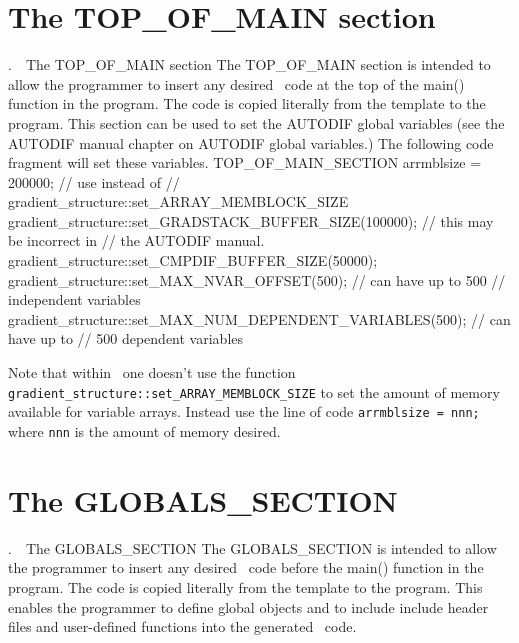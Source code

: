 \documentclass[12pt]{book}
\makeatletter
\def\mysection#1{\section{#1}{\bigbf \medbreak\noindent\number\c@chapter.\number\c@section\ \ #1\medbreak}}
\makeatother
\begin{document}
\htmlnewfile
{}
\mysection{The TOP\_OF\_MAIN section}
The TOP\_OF\_MAIN section is intended to allow the programmer to insert any desired
\cplus\ code at the top of the main() function in the program. The code is copied
literally from the template to the program.  This section can be used to set
the AUTODIF global variables (see the AUTODIF manual chapter on
AUTODIF global variables.)  The following code fragment will set these
variables.
\beginexample
TOP_OF_MAIN_SECTION
  arrmblsize = 200000; // use instead of 
                   // gradient_structure::set_ARRAY_MEMBLOCK_SIZE
  gradient_structure::set_GRADSTACK_BUFFER_SIZE(100000); // this may be incorrect in 
                                       // the AUTODIF manual.
  gradient_structure::set_CMPDIF_BUFFER_SIZE(50000); 
  gradient_structure::set_MAX_NVAR_OFFSET(500); // can have up to 500 
                                             // independent variables
  gradient_structure::set_MAX_NUM_DEPENDENT_VARIABLES(500); // can have up to 
                                          // 500 dependent variables
\endexample
{}

Note that within \ADM\ one doesn't use the function
{\tt gradient\_structure::set\_ARRAY\_MEMBLOCK\_SIZE} to set the amount of memory available
for variable arrays. Instead use the line of code {\tt arrmblsize = nnn;}
where {\tt nnn} is the amount of memory desired.

\mysection{The GLOBALS\_SECTION}
The GLOBALS\_SECTION is intended to allow the programmer to insert any desired
\cplus\ code before the  main() function in the program. The code is copied
literally from the template to the program. This enables the programmer to define
global objects and to include include header files and user-defined functions into
the generated \cplus\ code.
\end{document}
